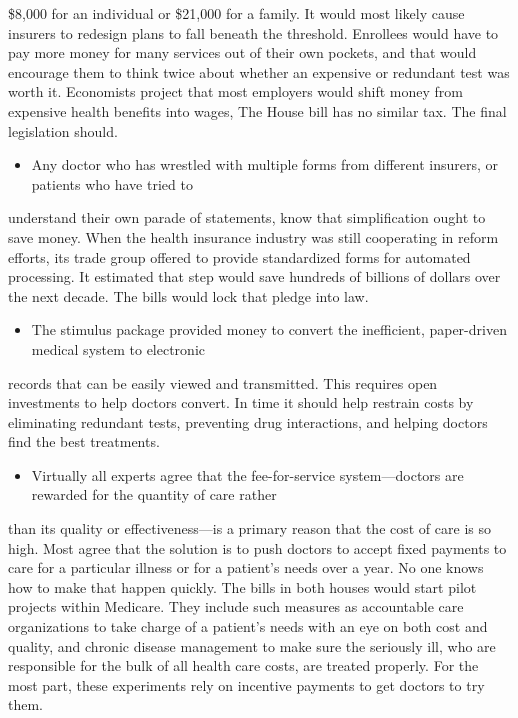 \documentclass[UTF8,11pt]{ctexart}
\begin{document}
\$8,000 for an individual or \$21,000 for a family. It would most likely cause insurers to redesign plans to fall beneath the threshold. Enrollees would have to pay more money for many services out of their own pockets, and that would encourage them to think twice about whether an expensive or redundant test was worth it. Economists project that most employers would shift money from expensive health benefits into wages, The House bill has no similar tax. The final legislation should.


\begin{itemize}[leftmargin=2em,itemsep=.2em,topsep=.4em]\item[G.] Any doctor who has wrestled with multiple forms from different insurers, or patients who have tried to
\end{itemize}

understand their own parade of statements, know that simplification ought to save money. When the health insurance industry was still cooperating in reform efforts, its trade group offered to provide standardized forms for automated processing. It estimated that step would save hundreds of billions of dollars over the next decade. The bills would lock that pledge into law.


\begin{itemize}[leftmargin=2em,itemsep=.2em,topsep=.4em]\item[H.] The stimulus package provided money to convert the inefficient, paper-driven medical system to electronic
\end{itemize}

records that can be easily viewed and transmitted. This requires open investments to help doctors convert. In time it should help restrain costs by eliminating redundant tests, preventing drug interactions, and helping doctors find the best treatments.


\begin{itemize}[leftmargin=2em,itemsep=.2em,topsep=.4em]\item[I.] Virtually all experts agree that the fee-for-service system—doctors are rewarded for the quantity of care rather
\end{itemize}

than its quality or effectiveness—is a primary reason that the cost of care is so high. Most agree that the solution is to push doctors to accept fixed payments to care for a particular illness or for a patient’s needs over a year. No one knows how to make that happen quickly. The bills in both houses would start pilot projects within Medicare. They include such measures as accountable care organizations to take charge of a patient’s needs with an eye on both cost and quality, and chronic disease management to make sure the seriously ill, who are responsible for the bulk of all health care costs, are treated properly. For the most part, these experiments rely on incentive payments to get doctors to try them.
\end{document}
